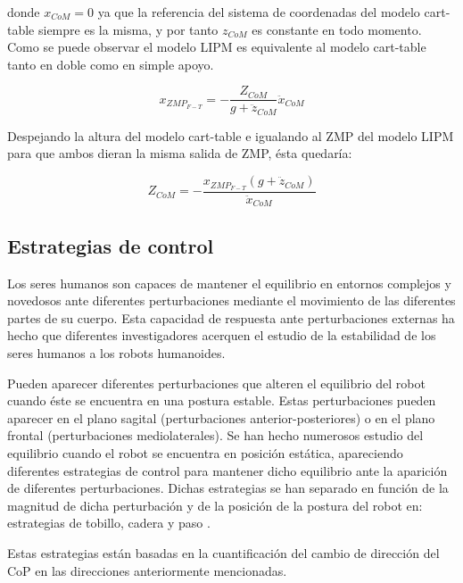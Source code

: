 donde $x_{CoM}=0$ ya que la referencia del sistema de coordenadas del modelo cart-table siempre es la misma, y por tanto $z_{CoM}$ es constante en todo momento. Como se puede observar el modelo LIPM es equivalente al modelo cart-table tanto en doble como en simple apoyo.

\begin{equation}
x_{ZMP_{F-T}}=-\frac{Z_{CoM}}{g+\ddot{z}_{CoM}}\ddot{x}_{CoM}
\label{ec436}
\end{equation}

Despejando la altura del modelo cart-table e igualando al ZMP del modelo LIPM para que ambos dieran la misma salida de ZMP, ésta quedaría:

\begin{equation}
Z_{CoM}=-\frac{x_{ZMP_{F-T}}(g+\ddot{z}_{CoM})}{\ddot{x}_{CoM}}
\label{ec437}
\end{equation}

\newpage

\subsection{Estrategias de control}

Los seres humanos son capaces de mantener el equilibrio en entornos complejos y novedosos ante diferentes perturbaciones mediante el movimiento de las diferentes partes de su cuerpo. Esta capacidad de respuesta ante perturbaciones externas ha hecho que diferentes investigadores acerquen el estudio de la estabilidad de los seres humanos a los robots humanoides.

Pueden aparecer diferentes perturbaciones que alteren el equilibrio del robot cuando éste se encuentra en una postura estable. Estas perturbaciones pueden aparecer en el plano sagital (perturbaciones anterior-posteriores) o en el plano frontal (perturbaciones mediolaterales). Se han hecho numerosos estudio del equilibrio cuando el robot se encuentra en posición estática, apareciendo diferentes estrategias de control para mantener dicho equilibrio ante la aparición de diferentes perturbaciones. Dichas estrategias se han separado en función de la magnitud de dicha perturbación y de la posición de la postura del robot en: estrategias de tobillo, cadera y paso \cite{ref17} \cite{ref18}.

Estas estrategias están basadas en la cuantificación del cambio de dirección del CoP en las direcciones anteriormente mencionadas.

